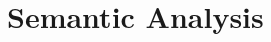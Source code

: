 \hypertarget{group__Semantic__Analysis}{}\section{Semantic Analysis}
\label{group__Semantic__Analysis}
